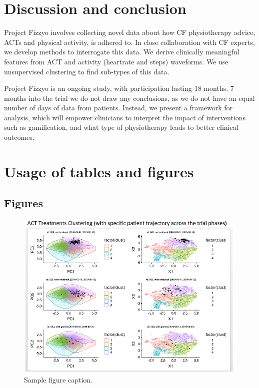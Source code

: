 \documentclass{article}
\begin{document}
\section{Discussion and conclusion} 

Project Fizzyo involves collecting novel data about how CF physiotherapy advice, ACTs and physical activity, is adhered to. In close collaboration with CF experts, we develop methods to interrogate this data. We derive clinically meaningful features from ACT and activity (heartrate and steps) waveforms. We use unsupervised clustering to find sub-types of this data. 

Project Fizzyo is an ongoing study, with participation lasting 18 months. 7 months into the trial we do not draw any conclusions, as we do not have an equal number of days of data from patients. Instead, we present a framework for analysis, which will empower clinicians to interpret the impact of interventions such as gamification, and what type of physiotherapy leads to better clinical outcomes.

\section{Usage of tables and figures}
\subsection{Figures}

\begin{figure}
  \centering
  \caption{Sample figure caption.}
  \includegraphics[]{sample_fig}
\end{figure}
\end{document}
